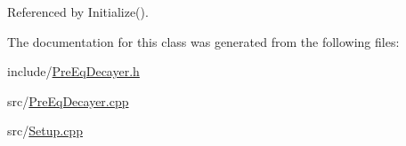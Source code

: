 Referenced by Initialize().



The documentation for this class was generated from the following files\-:\begin{DoxyCompactItemize}
\item 
include/\hyperlink{PreEqDecayer_8h}{Pre\-Eq\-Decayer.\-h}\item 
src/\hyperlink{PreEqDecayer_8cpp}{Pre\-Eq\-Decayer.\-cpp}\item 
src/\hyperlink{Setup_8cpp}{Setup.\-cpp}\end{DoxyCompactItemize}
